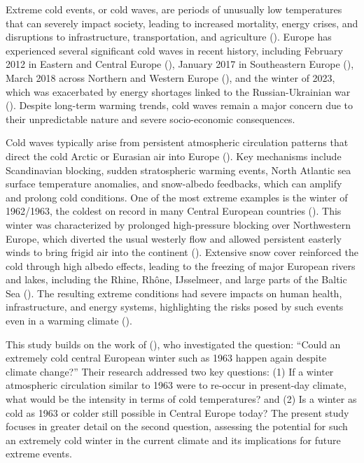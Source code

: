 \documentclass[
]{krantz}
\begin{document}
Extreme cold events, or cold waves, are periods of unusually low temperatures that can severely impact society, leading to increased mortality, energy crises, and disruptions to infrastructure, transportation, and agriculture (\citet{pinto2024}). Europe has experienced several significant cold waves in recent history, including February 2012 in Eastern and Central Europe (\citet{planchon2015}), January 2017 in Southeastern Europe (\citet{anagnostopoulou2017}), March 2018 across Northern and Western Europe (\citet{karpechko2018}), and the winter of 2023, which was exacerbated by energy shortages linked to the Russian-Ukrainian war (\citet{quesada2023}). Despite long-term warming trends, cold waves remain a major concern due to their unpredictable nature and severe socio-economic consequences.

Cold waves typically arise from persistent atmospheric circulation patterns that direct the cold Arctic or Eurasian air into Europe (\citet{quesada2023}). Key mechanisms include Scandinavian blocking, sudden stratospheric warming events, North Atlantic sea surface temperature anomalies, and snow-albedo feedbacks, which can amplify and prolong cold conditions. One of the most extreme examples is the winter of 1962/1963, the coldest on record in many Central European countries (\citep{eichler1970, sippel2024}). This winter was characterized by prolonged high-pressure blocking over Northwestern Europe, which diverted the usual westerly flow and allowed persistent easterly winds to bring frigid air into the continent (\citet{loikith2019}). Extensive snow cover reinforced the cold through high albedo effects, leading to the freezing of major European rivers and lakes, including the Rhine, Rhône, IJsselmeer, and large parts of the Baltic Sea (\citet{groisman1994}). The resulting extreme conditions had severe impacts on human health, infrastructure, and energy systems, highlighting the risks posed by such events even in a warming climate (\citet{eichler1970}).

This study builds on the work of (\citet{sippel2024}), who investigated the question: ``Could an extremely cold central European winter such as 1963 happen again despite climate change?'' Their research addressed two key questions: (1) If a winter atmospheric circulation similar to 1963 were to re-occur in present-day climate, what would be the intensity in terms of cold temperatures? and (2) Is a winter as cold as 1963 or colder still possible in Central Europe today? The present study focuses in greater detail on the second question, assessing the potential for such an extremely cold winter in the current climate and its implications for future extreme events.
\end{document}
